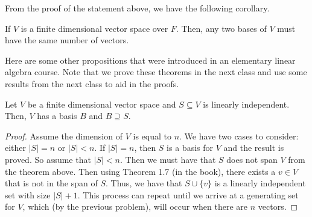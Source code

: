 \documentclass[main.tex]{subfiles}
\begin{document}
    From the proof of the statement above, we have the following corollary. 
    \begin{cor}{}{}
        If $V$ is a finite dimensional vector space over $F$. Then, any two bases of $V$ must have the same number of vectors. 
    \end{cor}

    Here are some other propositions that were introduced in an elementary linear algebra course. Note that we prove these theorems in the next class and use some results from the next class to aid in the proofs.
    \begin{prop}{}{}
        Let $V$ be a finite dimensional vector space and $S\subseteq V$ is linearly independent. Then, $V$ has a basis $B$ and $B \supseteq S$.
    \end{prop}
    \begin{proof}
        Assume the dimension of $V$ is equal to $n$. We have two cases to consider: either $|S| = n$ or $|S| < n$. If $|S| = n$, then $S$ is a basis for $V$ and the result is proved. So assume that $|S| < n$. Then we must have that $S$ does not span $V$ from the theorem above. Then using Theorem 1.7 (in the book), there exists a $v\in V$ that is not in the span of $S$. Thus, we have that $S\cup \{v\}$ is a linearly independent set with size $|S| + 1$. This process can repeat until we arrive at a generating set for $V$, which (by the previous problem), will occur when there are $n$ vectors. 
    \end{proof}
\end{document}

